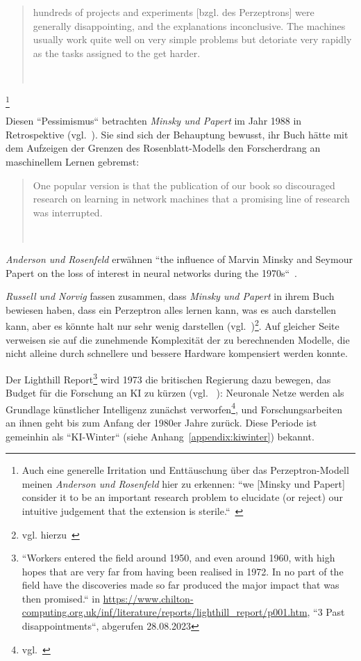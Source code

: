 \blockquote[{~\cite[19]{MP88}}]{
    hundreds of projects and experiments [bzgl. des Perzeptrons] were generally disappointing, and the explanations inconclusive. The machines usually work quite well on very simple problems but detoriate very rapidly as the tasks assigned to the get harder.
}\footnote{
    Auch eine generelle Irritation und Enttäuschung über das Perzeptron-Modell meinen \textit{Anderson und Rosenfeld} hier zu erkennen: ``we [Minsky und Papert] consider it to be an important research problem to elucidate (or reject) our intuitive judgement that the extension is sterile.``~\cite[232]{MP88}
}

\noindent
Diesen ``Pessimismus`` betrachten \textit{Minsky und Papert} im Jahr 1988 in Retrospektive (vgl.~\cite[xiii]{MP88}). Sie sind sich der Behauptung bewusst, ihr Buch hätte mit dem Aufzeigen der Grenzen des Rosenblatt-Modells den Forscherdrang an maschinellem Lernen gebremst:

\blockquote[{~\cite[xii]{MP88}}]{
    One popular version is  that the publication of our book so discouraged research on learning in network machines that a promising line of research was interrupted.
}

\noindent
\textit{Anderson und Rosenfeld} erwähnen ``the influence of Marvin Minsky and Seymour Papert on the loss of interest in neural networks during the 1970s``~\cite[X]{AR98}.

\textit{Russell und Norvig} fassen zusammen, dass \textit{Minsky und Papert} in ihrem Buch bewiesen haben, dass ein Perzeptron alles lernen kann, was es auch darstellen kann, aber es könnte halt nur sehr wenig darstellen (vgl.~\cite[45]{RN09})\footnote{
    vgl. hierzu~\cite[xiii]{MP88}
}.
Auf gleicher Seite verweisen sie auf die zunehmende Komplexität der zu berechnenden Modelle, die nicht alleine durch schnellere und bessere Hardware kompensiert werden konnte.

Der Lighthill Report\footnote{
    ``Workers entered the field around 1950, and even around 1960, with high hopes that are very far from having been realised in 1972. In no part of the field have the discoveries made so far produced the major impact that was then promised.`` in \url{https://www.chilton-computing.org.uk/inf/literature/reports/lighthill\_report/p001.htm}, ``3 Past disappointments``, abgerufen 28.08.2023
} wird 1973 die britischen Regierung dazu bewegen, das Budget für die Forschung an KI zu kürzen (vgl. ~\cite[45]{RN09}): Neuronale Netze werden als Grundlage künstlicher Intelligenz zunächst verworfen\footnote{
    vgl.~\cite[641]{Ola96}
}, und Forschungsarbeiten an ihnen geht bis zum Anfang der 1980er Jahre zurück.
Diese Periode ist gemeinhin als ``KI-Winter`` (siehe Anhang~\ref{appendix:kiwinter}) bekannt.\\

